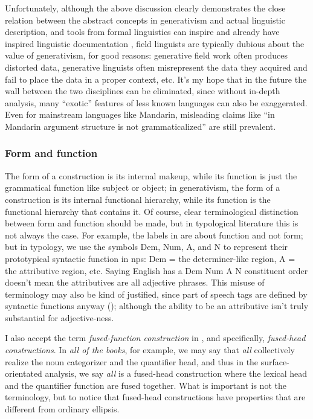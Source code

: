 \documentclass[UTF8, a4paper, oneside, scheme=plain, 12pt]{ctexbook}
\newcommand*{\term}[1]{\emph{#1}}
\newcommand{\form}[1]{\emph{#1}}
\begin{document}
{Unfortunately, although the above discussion clearly demonstrates 
the close relation between the abstract concepts in generativism 
and actual linguistic description, 
and tools from formal linguistics can inspire and already have inspired 
linguistic documentation \citep{rice2006let},
field linguists are typically dubious about  
the value of generativism,
for good reasons: 
generative field work often produces distorted data, 
generative linguists often misrepresent the data they acquired 
and fail to place the data in a proper context, etc.
It's my hope that in the future the wall 
between the two disciplines can be eliminated,
since without in-depth analysis, 
many ``exotic'' features of less known languages 
can also be exaggerated.
Even for mainstream languages like Mandarin, 
misleading claims like ``in Mandarin argument structure is not grammaticalized''
are still prevalent.

\subsubsection{Form and function}

The form of a construction is its internal makeup, 
while its function is just the grammatical function like subject or object;
in generativism, 
the form of a construction is its internal functional hierarchy, 
while its function is the functional hierarchy that contains it.
Of course, clear terminological distinction between form and function 
should be made, 
but in typological literature this is not always the case. 
For example, the labels in  are about function and not form;
but in typology, we use the symbols Dem, Num, A, and N to represent
their prototypical syntactic function in \acs{np}s:
Dem = the determiner-like region, 
A = the attributive region, etc. 
Saying English has a Dem Num A N constituent order 
doesn't mean the attributives are all adjective phrases.
This misuse of terminology may also be kind of justified,
since part of speech tags are defined by syntactic functions anyway
(); 
although the ability to be an attributive isn't truly substantial 
for adjective-ness.

I also accept the term \term{fused-function construction} in \citet{cgel},
and specifically, \form{fused-head constructions}.
In \form{all of the books}, for example, 
we may say that \form{all} collectively realize the noun categorizer and the quantifier head, 
and thus in the surface-orientated analysis, 
we say \form{all} is a fused-head construction 
where the lexical head and the quantifier function are fused together.
What is important is not the terminology,
but to notice that fused-head constructions 
have properties that are different from 
ordinary ellipsis. 

}
\end{document}
